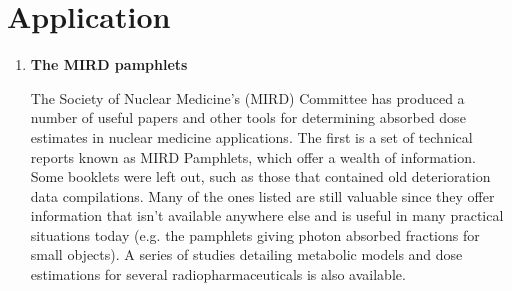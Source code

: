 \documentclass[12pt]{article}
\begin{document}
\section{Application}
\begin{enumerate}
\item \textbf{ The MIRD pamphlets} \par The Society of Nuclear Medicine's (MIRD) Committee has produced a number of useful papers and other tools for determining absorbed dose estimates in nuclear medicine applications. The first is a set of technical reports known as MIRD Pamphlets, which offer a wealth of information. Some booklets were left out, such as those that contained old deterioration data compilations. Many of the ones listed are still valuable since they offer information that isn't available anywhere else and is useful in many practical situations today (e.g. the pamphlets giving photon absorbed fractions for small objects). A series of studies detailing metabolic models and dose estimations for several radiopharmaceuticals is also available.
\end{enumerate}
\end{document}
